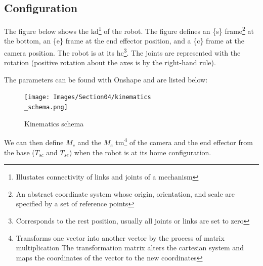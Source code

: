 \subsection{Configuration}

\bigbreak
The figure below shows the \gls{kd}\footnote{Illustates connectivity of links and joints of a mechanism} of the robot. The figure defines an \{s\} \gls{frame}\footnote{An abstract coordinate system whose origin, orientation, and scale are specified by a set of reference points} at the bottom, an \{e\} frame at the end effector position, and a \{c\} frame at the camera position. The robot is at its \gls{hc}\footnote{Corresponds to the rest position, usually all joints or links are set to zero}. The joints are represented with the rotation (positive rotation about the axes is by the right-hand rule).

\bigbreak 
The parameters can be found with Onshape and are listed below: 

\begin{center}
\end{center}

\begin{figure}[ht]
    \centering
    \texttt{[image: Images/Section04/kinematics\\\_schema.png]}
    \caption{Kinematics schema}
    \label{fig:kinematicsSchema}
\end{figure}
\FloatBarrier

\bigbreak
We can then define $M_c$ and the $M_e$ \gls{tm}\footnote{Transforms one vector into another vector by the process of matrix multiplication The transformation matrix alters the cartesian system and maps the coordinates of the vector to the new coordinates} of the camera and the end effector from the base ($T_{sc}$ and $T_{se}$) when the robot is at its home configuration. 

